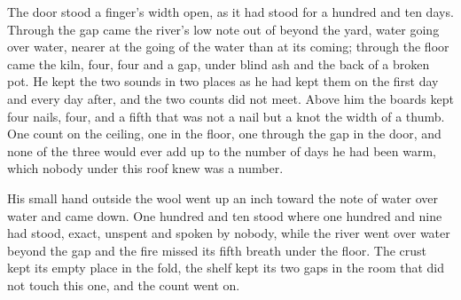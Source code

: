 The door stood a finger's width open, as it had stood for a hundred and ten days. Through the gap came the river's low note out of  beyond the yard, water going over water, nearer at the going of the water than at its coming; through the floor came the kiln, four, four and a gap, under blind ash and the back of a broken pot. He kept the two sounds in two places as he had kept them on the first day and every day after, and the two counts did not meet. Above him the boards kept four nails, four, and a fifth that was not a nail but a knot the width of a thumb. One count on the ceiling, one in the floor, one through the gap in the door, and none of the three would ever add up to the number of days he had been warm, which nobody under this roof knew was a number.

His small hand outside the wool went up an inch toward the note of water over water and came down. One hundred and ten stood where one hundred and nine had stood, exact, unspent and spoken by nobody, while the river went over water beyond the gap and the fire missed its fifth breath under the floor. The crust kept its empty place in the fold, the shelf kept its two gaps in the room that did not touch this one, and the count went on.
